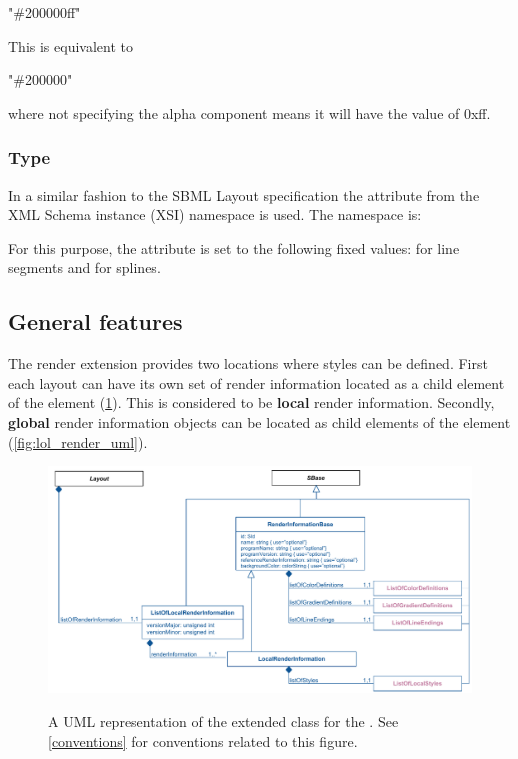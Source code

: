 \begin{center}
"\#200000ff"
\end{center}

This is equivalent to 
\begin{center}
"\#200000"
\end{center}

where not specifying the alpha component means it will have the value of 0xff. 

\subsubsection{Type \fixttspace{}}
\label{xsi_type}

In a similar fashion to the SBML Layout specification the  attribute from the XML Schema instance 
(XSI) namespace is used. The namespace is: 

\begin{center}
\end{center}

For this purpose, the attribute  is set to the following fixed 
values:  for line segments and  for 
splines. 


\subsection{General features}
\label{features}
The render extension provides two locations where styles can be defined. First 
each layout can have its own set of render information located as a child element
of the \Layout element (\ref{fig:Render_uml}).  This is considered to be \textbf{local} render information.
Secondly, \textbf{global} render information objects can be located as child elements of the \ListOfLayouts element (\ref{fig:lol_render_uml}). 

\begin{figure}[!ht]
  \centering
  \includegraphics[width=\textwidth]{images/render-layout-uml}\\
  \caption{A UML representation of the extended \Layout class for the \RenderPackage. See \ref{conventions} for conventions related to this figure.}
  \label{fig:Render_uml}
\end{figure}

